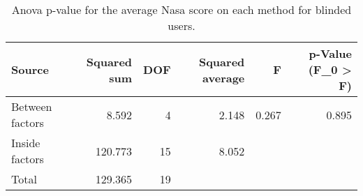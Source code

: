 
\begin{table}[!htb]
\centering
\caption{Anova p-value for the average Nasa score on each method for blinded users.}
\label{tab:anova_nasa_avg}
\begin{tabular}{lrrrrr}
\toprule
         Source &  Squared sum &  DOF & Squared average &     F & p-Value (F\_0 > F) \\
\midrule
Between factors &        8.592 &    4 &           2.148 & 0.267 &             0.895 \\
 Inside factors &      120.773 &   15 &           8.052 &       &                   \\
          Total &      129.365 &   19 &                 &       &                   \\
\bottomrule
\end{tabular}
\end{table}

